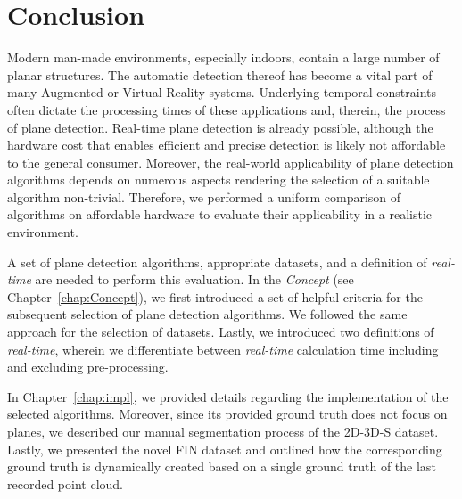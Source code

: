 \documentclass[main.tex]{subfiles}
\begin{document}
\chapter{Conclusion}
\label{chap:concl}

Modern man-made environments, especially indoors, contain a large number of planar structures. The automatic detection thereof has become a vital part of many Augmented or Virtual Reality systems. Underlying temporal constraints often dictate the processing times of these applications and, therein, the process of plane detection. Real-time plane detection is already possible, although the hardware cost that enables efficient and precise detection is likely not affordable to the general consumer. 
Moreover, the real-world applicability of plane detection algorithms depends on numerous aspects rendering the selection of a suitable algorithm non-trivial.
Therefore, we performed a uniform comparison of algorithms on affordable hardware to evaluate their applicability in a realistic environment.

A set of plane detection algorithms, appropriate datasets, and a definition of \textit{real-time} are needed to perform this evaluation. In the \textit{Concept} (see Chapter~\ref{chap:Concept}), we first introduced a set of helpful criteria for the subsequent selection of plane detection algorithms. We followed the same approach for the selection of datasets. Lastly, we introduced two definitions of \textit{real-time}, wherein we differentiate between \textit{real-time} calculation time including and excluding pre-processing.

In Chapter~\ref{chap:impl}, we provided details regarding the implementation of the selected algorithms. Moreover, since its provided ground truth does not focus on planes, we described our manual segmentation process of the 2D-3D-S dataset. Lastly, we presented the novel FIN dataset and outlined how the corresponding ground truth is dynamically created based on a single ground truth of the last recorded point cloud.
\end{document}
